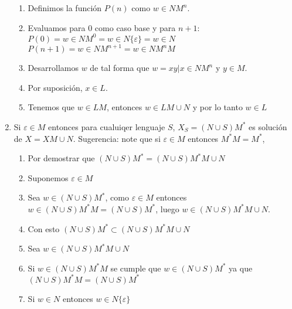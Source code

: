 \documentclass[a4paper, 12pt]{article}
\begin{document}
\begin{enumerate}
\begin{enumerate}[label = -]
        \item Definimos la función $P(n)$ como $w \in NM^{n}$.

        \item Evaluamos para 0 como caso base y para $n + 1$:
        \\ $P(0) = w \in NM^{0} = w \in N\{ \varepsilon \} = w \in N$
        \\ $P(n + 1) = w \in NM^{n + 1} = w \in NM^{n}M$

        \item Desarrollamos $w$ de tal forma que $w = xy | x \in NM^{n}$ y $y \in M$.

        \item Por suposición, $x \in L$.
        
        \item Tenemos que $w \in LM$, entonces $w \in LM \cup N$ y por lo tanto $w \in L$
    \end{enumerate}


    \newpage


    \vspace{0.5cm}
    \item Si $\varepsilon \in M$ entonces para cualuiqer lenguaje $S$, $X_{S}=(N \cup S)M^{*}$ es solución de $X = XM \cup N$. Sugerencia: note que si $\varepsilon \in M$ entonces $M^{*}M = M^{*}$,
    \begin{enumerate}[label = -]
        \item Por demostrar que $(N \cup S)M^{*} = (N \cup S)M^{*}M \cup N$

        \item Suponemos $\varepsilon \in M$

        \item Sea $w \in (N \cup S)M^{*}$, como $\varepsilon \in M$ entonces $w \in (N \cup S)M^{*}M = (N \cup S)M^{*}$, luego $w \in (N \cup S)M^{*}M \cup N$.

        \item Con esto $(N \cup S)M^{*} \subset (N \cup S)M^{*}M \cup N$

        \item Sea $w \in (N \cup S)M^{*}M \cup N$

        \item Si $w \in (N \cup S)M^{*}M$ se cumple que $w \in (N \cup S)M^{*}$ ya que $(N \cup S)M^{*}M = (N \cup S)M^{*}$

        \item Si $w \in N$ entonces $w \in N\{ \varepsilon \}$


\end{enumerate}
\end{enumerate}
\end{document}
